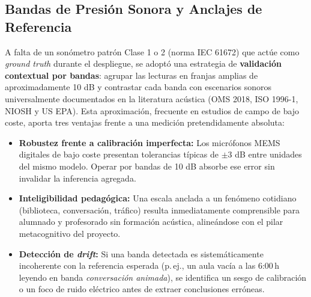 \documentclass[11pt,a4paper]{article}
\begin{document}
\subsection{Bandas de Presión Sonora y Anclajes de Referencia}

A falta de un sonómetro patrón Clase 1 o 2 (norma IEC 61672) que actúe como \textit{ground truth} durante el despliegue, se adoptó una estrategia de \textbf{validación contextual por bandas}: agrupar las lecturas en franjas amplias de aproximadamente 10 dB y contrastar cada banda con escenarios sonoros universalmente documentados en la literatura acústica (OMS 2018, ISO 1996-1, NIOSH y US EPA). Esta aproximación, frecuente en estudios de campo de bajo coste, aporta tres ventajas frente a una medición pretendidamente absoluta:

\begin{itemize}
    \item \textbf{Robustez frente a calibración imperfecta:} Los micrófonos MEMS digitales de bajo coste presentan tolerancias típicas de $\pm 3$ dB entre unidades del mismo modelo. Operar por bandas de 10 dB absorbe ese error sin invalidar la inferencia agregada.
    \item \textbf{Inteligibilidad pedagógica:} Una escala anclada a un fenómeno cotidiano (biblioteca, conversación, tráfico) resulta inmediatamente comprensible para alumnado y profesorado sin formación acústica, alineándose con el pilar metacognitivo del proyecto.
    \item \textbf{Detección de \textit{drift}:} Si una banda detectada es sistemáticamente incoherente con la referencia esperada (p.\,ej., un aula vacía a las 6:00\,h leyendo en banda \textit{conversación animada}), se identifica un sesgo de calibración o un foco de ruido eléctrico antes de extraer conclusiones erróneas.
\end{itemize}
\end{document}
